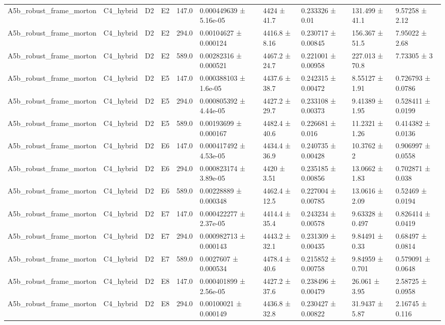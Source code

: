 \begin{table}
\begin{tabular}{llllllllll}
A5b\_robust\_frame\_morton & C4\_hybrid & D2 & E2 & 147.0 & 0.000449639 ± 5.16e-05 & 4424 ± 41.7 & 0.233326 ± 0.01 & 131.499 ± 41.1 & 9.57258 ± 2.12 \\
A5b\_robust\_frame\_morton & C4\_hybrid & D2 & E2 & 294.0 & 0.00104627 ± 0.000124 & 4416.8 ± 8.16 & 0.230717 ± 0.00845 & 156.367 ± 51.5 & 7.95022 ± 2.68 \\
A5b\_robust\_frame\_morton & C4\_hybrid & D2 & E2 & 589.0 & 0.00282316 ± 0.000521 & 4467.2 ± 24.7 & 0.221001 ± 0.00958 & 227.013 ± 70.8 & 7.73305 ± 3 \\
A5b\_robust\_frame\_morton & C4\_hybrid & D2 & E5 & 147.0 & 0.000388103 ± 1.6e-05 & 4437.6 ± 38.7 & 0.242315 ± 0.00472 & 8.55127 ± 1.91 & 0.726793 ± 0.0786 \\
A5b\_robust\_frame\_morton & C4\_hybrid & D2 & E5 & 294.0 & 0.000805392 ± 4.44e-05 & 4427.2 ± 29.7 & 0.233108 ± 0.00373 & 9.41389 ± 1.95 & 0.528411 ± 0.0199 \\
A5b\_robust\_frame\_morton & C4\_hybrid & D2 & E5 & 589.0 & 0.00193699 ± 0.000167 & 4482.4 ± 40.6 & 0.226681 ± 0.016 & 11.2321 ± 1.26 & 0.414382 ± 0.0136 \\
A5b\_robust\_frame\_morton & C4\_hybrid & D2 & E6 & 147.0 & 0.000417492 ± 4.53e-05 & 4434.4 ± 36.9 & 0.240735 ± 0.00428 & 10.3762 ± 2 & 0.906997 ± 0.0558 \\
A5b\_robust\_frame\_morton & C4\_hybrid & D2 & E6 & 294.0 & 0.000823174 ± 3.89e-05 & 4420 ± 3.51 & 0.235185 ± 0.00856 & 13.0662 ± 1.83 & 0.702871 ± 0.038 \\
A5b\_robust\_frame\_morton & C4\_hybrid & D2 & E6 & 589.0 & 0.00228889 ± 0.000348 & 4462.4 ± 12.5 & 0.227004 ± 0.00785 & 13.0616 ± 2.09 & 0.52469 ± 0.0194 \\
A5b\_robust\_frame\_morton & C4\_hybrid & D2 & E7 & 147.0 & 0.000422277 ± 2.37e-05 & 4414.4 ± 35.4 & 0.243234 ± 0.00578 & 9.63328 ± 0.497 & 0.826414 ± 0.0419 \\
A5b\_robust\_frame\_morton & C4\_hybrid & D2 & E7 & 294.0 & 0.000982713 ± 0.000143 & 4443.2 ± 32.1 & 0.231309 ± 0.00435 & 9.84491 ± 0.33 & 0.68497 ± 0.0814 \\
A5b\_robust\_frame\_morton & C4\_hybrid & D2 & E7 & 589.0 & 0.0027607 ± 0.000534 & 4478.4 ± 40.6 & 0.215852 ± 0.00758 & 9.84959 ± 0.701 & 0.579091 ± 0.0648 \\
A5b\_robust\_frame\_morton & C4\_hybrid & D2 & E8 & 147.0 & 0.000401899 ± 2.56e-05 & 4427.2 ± 37.6 & 0.238496 ± 0.00479 & 26.061 ± 3.95 & 2.58725 ± 0.0958 \\
A5b\_robust\_frame\_morton & C4\_hybrid & D2 & E8 & 294.0 & 0.00100021 ± 0.000149 & 4436.8 ± 32.8 & 0.230427 ± 0.00822 & 31.9437 ± 5.87 & 2.16745 ± 0.116 \\

\end{tabular}
\end{table}
